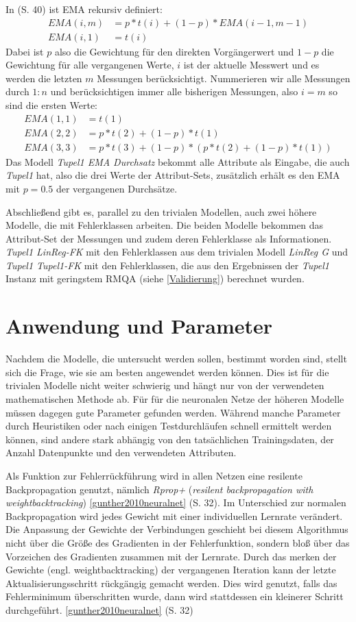 \documentclass[
	12pt,
	a4paper,
	BCOR10mm,
	DIV14,
	listof=totoc,
	bibliography=totoc,
	headsepline
]{scrreprt}
\begin{document}
In \cite{kantardzic2011data} (S. 40) ist EMA rekursiv definiert:
\begin{align*}
	EMA(i,m) &= p*t(i)+(1-p)*EMA(i-1,m-1)\\
	EMA(i,1) &= t(i)
\end{align*}
Dabei ist $p$ also die Gewichtung für den direkten Vorgängerwert und $1-p$ die Gewichtung für alle vergangenen Werte, $i$ ist der aktuelle Messwert und es werden die letzten $m$ Messungen berücksichtigt. Nummerieren wir alle Messungen durch $1:n$ und berücksichtigen immer alle bisherigen Messungen, also $i = m$ so sind die ersten Werte:
\begin{align*}
EMA(1,1) &= t(1)\\
EMA(2,2) &=  p*t(2)+(1-p)*t(1)\\
EMA(3,3) &=  p*t(3)+(1-p)*(p*t(2)+(1-p)*t(1))
\end{align*}
Das Modell \textit{Tupel1 EMA Durchsatz} bekommt alle Attribute als Eingabe, die auch \textit{Tupel1} hat, also die drei Werte der Attribut-Sets, zusätzlich erhält es den EMA mit $p=0.5$ der vergangenen Durchsätze.

Abschließend gibt es, parallel zu den trivialen Modellen, auch zwei höhere Modelle, die mit Fehlerklassen arbeiten.
Die beiden Modelle bekommen das Attribut-Set der Messungen und zudem deren Fehlerklasse als Informationen.
\textit{Tupel1 LinReg-FK} mit den Fehlerklassen aus dem trivialen Modell \textit{LinReg G} und \textit{Tupel1 Tupel1-FK} mit den Fehlerklassen, die aus den Ergebnissen der \textit{Tupel1} Instanz mit geringstem RMQA (siehe \ref{Validierung}) berechnet wurden.

\section{Anwendung und Parameter}
Nachdem die Modelle, die untersucht werden sollen, bestimmt worden sind, stellt sich die Frage, wie sie am besten angewendet werden können. Dies ist für die trivialen Modelle nicht weiter schwierig und hängt nur von der verwendeten mathematischen Methode ab.
Für für die neuronalen Netze der höheren Modelle müssen dagegen gute Parameter gefunden werden.
Während manche Parameter durch Heuristiken oder nach einigen Testdurchläufen schnell ermittelt werden können, sind andere stark abhängig von den tatsächlichen Trainingsdaten, der Anzahl Datenpunkte und den verwendeten Attributen. 

Als Funktion zur Fehlerrückführung wird in allen Netzen eine resilente Backpropagation genutzt, nämlich \textit{Rprop+} (\textit{resilent backpropagation with weightbacktracking}) \ref{gunther2010neuralnet} (S. 32).
Im Unterschied zur normalen Backpropagation wird jedes Gewicht mit einer individuellen Lernrate verändert. Die Anpassung der Gewichte der Verbindungen geschieht bei diesem Algorithmus nicht über die Größe des Gradienten in der Fehlerfunktion, sondern bloß über das Vorzeichen des Gradienten zusammen mit der Lernrate.
Durch das merken der Gewichte (engl. weightbacktracking) der vergangenen Iteration kann der letzte Aktualisierungsschritt rückgängig gemacht werden. Dies wird genutzt, falls das Fehlerminimum überschritten wurde, dann wird stattdessen ein kleinerer Schritt durchgeführt. \ref{gunther2010neuralnet} (S. 32)
\end{document}
